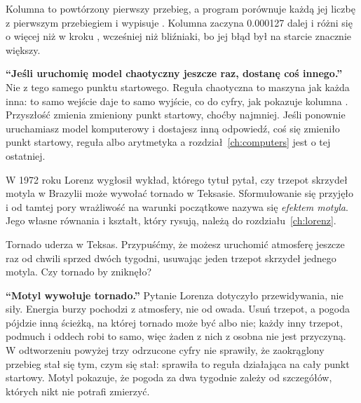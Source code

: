 
\noindent
Kolumna  to powtórzony pierwszy przebieg, a program porównuje
każdą jej liczbę z pierwszym przebiegiem i wypisuje . Kolumna
 zaczyna \num{0.000127} dalej i różni się o więcej niż
 w kroku , wcześniej niż bliźniaki, bo
jej błąd był na starcie znacznie większy.

\begin{trapbox}
\textbf{\enquote{Jeśli uruchomię model chaotyczny jeszcze raz, dostanę coś
innego.}} Nie z tego samego punktu startowego. Reguła chaotyczna to maszyna
jak każda inna: to samo wejście daje to samo wyjście, co do cyfry, jak
pokazuje kolumna . Przyszłość zmienia zmieniony punkt startowy,
choćby najmniej. Jeśli ponownie uruchamiasz model komputerowy i dostajesz
inną odpowiedź, coś się zmieniło \dash{} punkt startowy, reguła albo
arytmetyka \dash{} a rozdział~\ref{ch:computers} jest o tej ostatniej.
\end{trapbox}

\noindent
W 1972 roku Lorenz wygłosił wykład, którego tytuł pytał, czy trzepot
skrzydeł motyla w Brazylii może wywołać tornado w Teksasie. Sformułowanie
się przyjęło i od tamtej pory wrażliwość na warunki początkowe nazywa się
\emph{efektem motyla}. Jego własne równania i kształt, który rysują,
należą do rozdziału~\ref{ch:lorenz}.

\begin{think}
Tornado uderza w Teksas. Przypuśćmy, że możesz uruchomić atmosferę jeszcze
raz od chwili sprzed dwóch tygodni, usuwając jeden trzepot skrzydeł jednego
motyla. Czy tornado by zniknęło?
\end{think}

\begin{trapbox}
\textbf{\enquote{Motyl wywołuje tornado.}} Pytanie Lorenza dotyczyło
przewidywania, nie siły. Energia burzy pochodzi z atmosfery, nie od owada.
Usuń trzepot, a pogoda pójdzie inną ścieżką, na której tornado może być
albo nie; każdy inny trzepot, podmuch i oddech robi to samo, więc żaden z
nich z osobna nie jest przyczyną. W odtworzeniu powyżej trzy odrzucone
cyfry nie sprawiły, że zaokrąglony przebieg stał się tym, czym się stał:
sprawiła to reguła działająca na cały punkt startowy. Motyl pokazuje, że
pogoda za dwa tygodnie zależy od szczegółów, których nikt nie potrafi
zmierzyć.
\end{trapbox}

